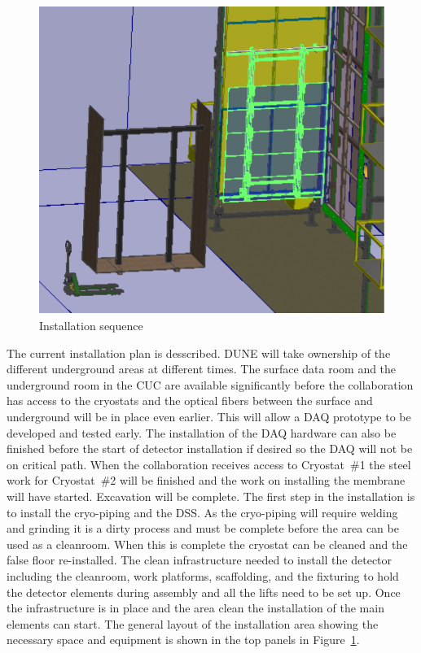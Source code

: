 \begin{figure}[htbp]
\begin{center}
\begin{minipage}[c]{0.32\textwidth}
\end{minipage}
\begin{minipage}[c]{0.32\textwidth}
\includegraphics[width=\textwidth]{far-detector-single-phase/figures/CPA-3.pdf}
\end{minipage}

\caption{Installation sequence}
\label{Install-Seq}
\end{center}
\end{figure}



The current installation plan is desscribed. DUNE will take
ownership of the different underground areas at different times. The
surface data room and the underground room in the CUC are available
significantly before the collaboration has access to the cryostats and
the optical fibers between the surface and underground will be in
place even earlier. This will allow a DAQ prototype to be developed
and tested early. The installation of the DAQ hardware can also be
finished before the start of detector installation if desired so the
DAQ will not be on critical path.  When the collaboration receives
access to Cryostat~\#1 the steel work for Cryostat~\#2 will be
finished and the work on installing the membrane will have
started. Excavation will be complete.  The first step in the
installation is to install the cryo-piping and the DSS. As the
cryo-piping will require welding and grinding it is a dirty process
and must be complete before the area can be used as a cleanroom. When
this is complete the cryostat can be cleaned and the false floor
re-installed. The clean infrastructure needed to install the detector
including the cleanroom, work platforms, scaffolding, and the
fixturing to hold the detector elements during assembly and all the
lifts need to be set up. Once the infrastructure is in place and the area
clean the installation of the main elements can start. The general
layout of the installation area showing the necessary space and
equipment is shown in the top panels in Figure~\ref{Install-Seq}.

